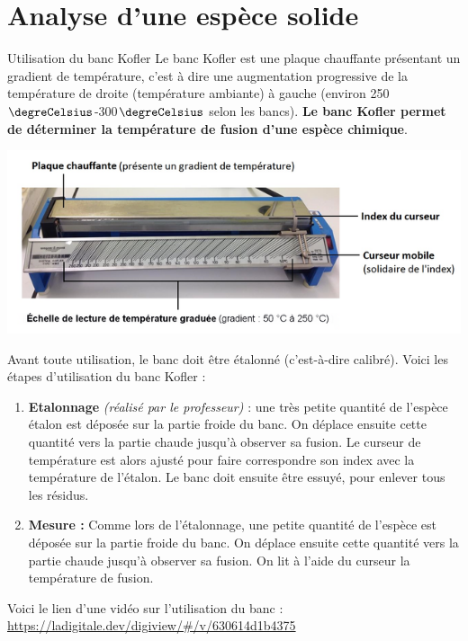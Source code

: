 \section{Analyse d'une espèce solide}

\begin{doc}{Utilisation du banc Kofler}
Le banc Kofler est une plaque chauffante présentant un gradient de température, c’est à dire une augmentation progressive de la température de droite (température ambiante) à gauche (environ 250$\degreCelsius$-300$\degreCelsius$ selon les bancs). \textbf{Le banc Kofler permet de déterminer la température de fusion d’une espèce chimique}.
\begin{center}
    \includegraphics[scale=0.65]{Images/Banc_Kofler.png} 
\end{center}

Avant toute utilisation, le banc doit être étalonné (c’est-à-dire calibré). Voici les étapes d'utilisation du banc Kofler :
\begin{enumerate}
    \item \textbf{Etalonnage} \textit{(réalisé par le professeur)} : une très petite quantité de l’espèce étalon est déposée sur la partie froide du banc. On déplace ensuite cette quantité vers la partie chaude jusqu’à observer sa fusion. Le curseur de température est alors ajusté pour faire correspondre son index avec la température de l’étalon. Le banc doit ensuite être essuyé, pour enlever tous les résidus.
    \item \textbf{Mesure :} Comme lors de l’étalonnage, une petite quantité de l’espèce est déposée sur la partie froide du banc. On déplace ensuite cette quantité vers la partie chaude jusqu’à observer sa fusion. On lit à l’aide du curseur la température de fusion.
\end{enumerate}
Voici le lien d'une vidéo sur l'utilisation du banc : \url{https://ladigitale.dev/digiview/#/v/630614d1b4375}\\
\end{doc}

